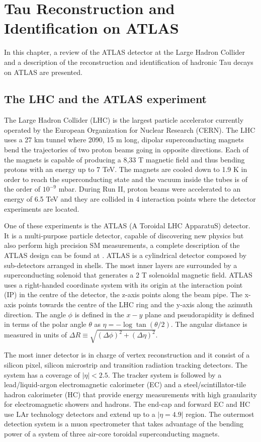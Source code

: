 \chapter{Tau Reconstruction and Identification on ATLAS}\label{ATLAS}
In this chapter, a review of the ATLAS detector at the Large Hadron Collider and a description of the reconstruction and identification of hadronic Tau decays on ATLAS are presented.
\section{The LHC and the ATLAS experiment}
The Large Hadron Collider (LHC) is the largest particle accelerator currently operated by the European Organization for Nuclear Research (CERN). The LHC uses a 27 km tunnel where 2090, 15 m long, dipolar superconducting magnets bend the trajectories of two proton beams going in opposite directions. Each of the magnets is capable of producing a 8,33 T magnetic field and thus bending protons with an energy up to 7 TeV. The magnets are cooled down to 1.9 K in order to reach the superconducting state and the vacuum inside the tubes is of the order of $10^{-9}$ mbar. During Run II, proton beams were accelerated to an energy of 6.5 TeV and they are collided in 4 interaction points where the detector experiments are located.

One of these experiments is the ATLAS (A Toroidal LHC ApparatuS) detector. It is a multi-purpose particle detector, capable of discovering new physics but also perform high precision SM measurements, a complete description of the ATLAS design can be found at \cite{ATLAS:1999uwa}. ATLAS is a cylindrical detector composed by sub-detectors arranged in shells. The most inner layers are surrounded by a superconducting solenoid that generates a 2 T solenoidal magnetic field. ATLAS uses a right-handed coordinate system with its origin at the interaction point (IP) in the centre of the detector, the z-axis points along the beam pipe. The x-axis points towards the centre of the LHC ring and the y-axis along the azimuth direction. The angle $\phi$ is defined in the $x-y$ plane and pseudorapidity is defined in terms of the polar angle $\theta$ as $\eta=-\log \tan(\theta/2)$. The angular distance is measured in units of $\Delta R\equiv \sqrt{(\Delta\phi)^2+(\Delta\eta)^2}$.

The most inner detector is in charge of vertex reconstruction and it consist of a silicon pixel, silicon microstrip and transition radiation tracking detectors. The system has a coverage of $|\eta|<2.5$. The tracker system is followed by a lead/liquid-argon electromagnetic calorimeter (EC) and a steel/scintillator-tile hadron calorimeter (HC) that provide energy measurements with high granularity for electromagnetic showers and hadrons. The end-cap and forward EC and HC use LAr technology detectors and extend up to a $|\eta=4.9|$ region. The outermost detection system is a muon spectrometer that takes advantage of the bending power of a system of three air-core toroidal superconducting magnets.
  
